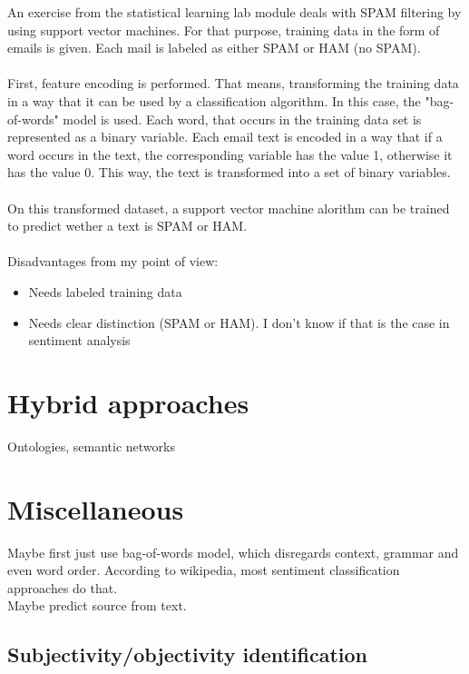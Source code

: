 \documentclass{article}
\begin{document}
An exercise from the statistical learning lab module deals with SPAM filtering by using support vector machines. For that purpose, training data in the form of emails is given. Each mail is labeled as either SPAM or HAM (no SPAM).\\
\\
First, feature encoding is performed. That means, transforming the training data in a way that it can be used by a classification algorithm. In this case, the "bag-of-words" model is used. Each word, that occurs in the training data set is represented as a binary variable. Each email text is encoded in a way that if a word occurs in the text, the corresponding variable has the value 1, otherwise it has the value 0. This way, the text is transformed into a set of binary variables. 
\\
\\
On this transformed dataset, a support vector machine alorithm can be trained to predict wether a text is SPAM or HAM.
\\
\\
Disadvantages from my point of view:
\begin{itemize}
  \item Needs labeled training data
  \item Needs clear distinction (SPAM or HAM). I don't know if that is the case in  sentiment analysis
\end{itemize}

\section{Hybrid approaches}

Ontologies, semantic networks

\section{Miscellaneous}

Maybe first just use bag-of-words model, which disregards context, grammar and even word order. According to wikipedia, most sentiment classification approaches do that.
\\
Maybe predict source from text.

\subsection{Subjectivity/objectivity identification}
\end{document}
